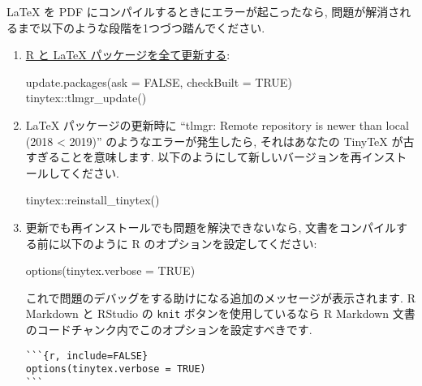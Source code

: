 \documentclass[
  xelatex,ja=standard,jafont=noto]{bxjsreport}
\newenvironment{Shaded}{\begin{snugshade}}{\end{snugshade}}
\newcommand{\AttributeTok}[1]{\textcolor[rgb]{0.77,0.63,0.00}{#1}}
\newcommand{\ConstantTok}[1]{\textcolor[rgb]{0.00,0.00,0.00}{#1}}
\newcommand{\FunctionTok}[1]{\textcolor[rgb]{0.00,0.00,0.00}{#1}}
\newcommand{\NormalTok}[1]{#1}
\newcommand{\SpecialCharTok}[1]{\textcolor[rgb]{0.00,0.00,0.00}{#1}}
\begin{document}
LaTeX を PDF にコンパイルするときにエラーが起こったなら,
問題が解消されるまで以下のような段階を1つづつ踏んでください.

\begin{enumerate}
\def\labelenumi{\arabic{enumi}.}
\item
  \href{https://yihui.org/en/2017/05/when-in-doubt-upgrade/}{R と LaTeX
  パッケージを全て更新する}:

\begin{Shaded}
\begin{Highlighting}[numbers=left,,]
\FunctionTok{update.packages}\NormalTok{(}\AttributeTok{ask =} \ConstantTok{FALSE}\NormalTok{, }\AttributeTok{checkBuilt =} \ConstantTok{TRUE}\NormalTok{)}
\NormalTok{tinytex}\SpecialCharTok{::}\FunctionTok{tlmgr\_update}\NormalTok{()}
\end{Highlighting}
\end{Shaded}
\item
  LaTeX パッケージの更新時に ``tlmgr: Remote repository is newer than
  local (2018 \textless{} 2019)'' のようなエラーが発生したら,
  それはあなたの TinyTeX が古すぎることを意味します.
  以下のようにして新しいバージョンを再インストールしてください.

\begin{Shaded}
\begin{Highlighting}[numbers=left,,]
\NormalTok{tinytex}\SpecialCharTok{::}\FunctionTok{reinstall\_tinytex}\NormalTok{()}
\end{Highlighting}
\end{Shaded}
\item
  更新でも再インストールでも問題を解決できないなら,
  文書をコンパイルする前に以下のように R のオプションを設定してください:

\begin{Shaded}
\begin{Highlighting}[numbers=left,,]
\FunctionTok{options}\NormalTok{(}\AttributeTok{tinytex.verbose =} \ConstantTok{TRUE}\NormalTok{)}
\end{Highlighting}
\end{Shaded}

  これで問題のデバッグをする助けになる追加のメッセージが表示されます. R
  Markdown と RStudio の \texttt{knit} ボタンを使用しているなら R
  Markdown 文書のコードチャンク内でこのオプションを設定すべきです.

\begin{verbatim}
```{r, include=FALSE}
options(tinytex.verbose = TRUE)
```
\end{verbatim}


\end{enumerate}
\end{document}
